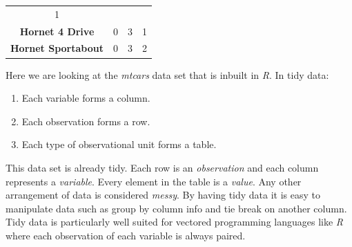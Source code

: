 \documentclass[12pt,oneside]{reedthesis}
\providecommand{\tightlist}{%
  \setlength{\itemsep}{0pt}\setlength{\parskip}{0pt}}
\theoremstyle{definition}
\theoremstyle{definition}
\theoremstyle{definition}
\theoremstyle{remark}
\begin{document}
\begin{longtable}[]{@{}cccc@{}}
\begin{minipage}[t]{0.09\columnwidth}
1\strut
\end{minipage}\tabularnewline
\begin{minipage}[t]{0.30\columnwidth}\centering\strut
\textbf{Hornet 4 Drive}\strut
\end{minipage} & \begin{minipage}[t]{0.06\columnwidth}\centering\strut
0\strut
\end{minipage} & \begin{minipage}[t]{0.09\columnwidth}\centering\strut
3\strut
\end{minipage} & \begin{minipage}[t]{0.09\columnwidth}\centering\strut
1\strut
\end{minipage}\tabularnewline
\begin{minipage}[t]{0.30\columnwidth}\centering\strut
\textbf{Hornet Sportabout}\strut
\end{minipage} & \begin{minipage}[t]{0.06\columnwidth}\centering\strut
0\strut
\end{minipage} & \begin{minipage}[t]{0.09\columnwidth}\centering\strut
3\strut
\end{minipage} & \begin{minipage}[t]{0.09\columnwidth}\centering\strut
2\strut
\end{minipage}\tabularnewline
\bottomrule
\end{longtable}
Here we are looking at the \emph{mtcars} data set that is inbuilt in
\emph{R}. In tidy data:
\begin{enumerate}
\def\labelenumi{\arabic{enumi}.}
\tightlist
\item
  Each variable forms a column.
\item
  Each observation forms a row.
\item
  Each type of observational unit forms a table.
\end{enumerate}
This data set is already tidy. Each row is an \emph{observation} and
each column represents a \emph{variable}. Every element in the table is
a \emph{value}. Any other arrangement of data is considered
\emph{messy}. By having tidy data it is easy to manipulate data such as
group by column info and tie break on another column. Tidy data is
particularly well suited for vectored programming languages like
\emph{R} where each observation of each variable is always paired.
\end{document}
